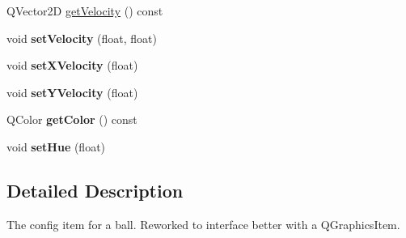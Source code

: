 \begin{DoxyCompactItemize}
\item 
Q\-Vector2\-D \hyperlink{classBallConfigItem_a8904b6b51a76adce2ec0f3bccbcb5a77}{get\-Velocity} () const 
\item 
\hypertarget{classBallConfigItem_afcc9b01b66ec2ff098e632f1f65b46e8}{void {\bfseries set\-Velocity} (float, float)}\label{classBallConfigItem_afcc9b01b66ec2ff098e632f1f65b46e8}

\item 
\hypertarget{classBallConfigItem_ab4ead3248eaf21df972cffecc1f8d84f}{void {\bfseries set\-X\-Velocity} (float)}\label{classBallConfigItem_ab4ead3248eaf21df972cffecc1f8d84f}

\item 
\hypertarget{classBallConfigItem_a5ac1e20cc83ed6071a70ae4df7fe38ec}{void {\bfseries set\-Y\-Velocity} (float)}\label{classBallConfigItem_a5ac1e20cc83ed6071a70ae4df7fe38ec}

\item 
\hypertarget{classBallConfigItem_ad33c2bd7a2d9f7279a31e63fa3352ab8}{Q\-Color {\bfseries get\-Color} () const }\label{classBallConfigItem_ad33c2bd7a2d9f7279a31e63fa3352ab8}

\item 
\hypertarget{classBallConfigItem_a43ff7257f2c6836b90a5aff2afb66304}{void {\bfseries set\-Hue} (float)}\label{classBallConfigItem_a43ff7257f2c6836b90a5aff2afb66304}

\end{DoxyCompactItemize}


\subsection{Detailed Description}
The config item for a ball. Reworked to interface better with a Q\-Graphics\-Item. 

